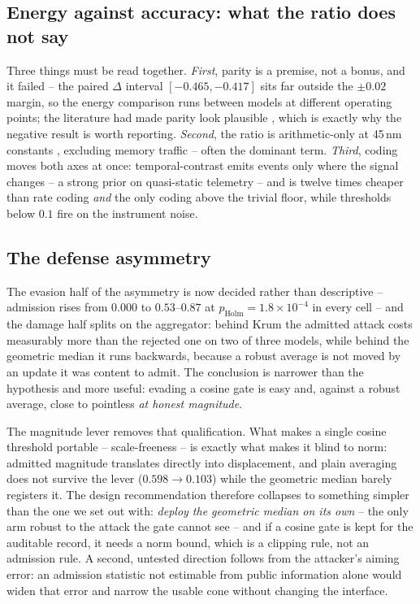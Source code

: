 \subsection{Energy against accuracy: what the ratio does not say}

Three things must be read together. \emph{First}, parity is a premise,
not a bonus, and it failed -- the paired $\Delta$\macroF{} interval
$[-0.465,-0.417]$ sits far outside the $\pm0.02$ margin, so the energy
comparison runs between models at different operating points; the
literature had made parity look plausible \cite{mahapatra2021}, which is
exactly why the negative result is worth reporting. \emph{Second}, the
ratio is arithmetic-only at 45\,nm constants \cite{horowitz2014},
excluding memory traffic -- often the dominant term. \emph{Third},
coding moves both axes at once: temporal-contrast emits events only
where the signal changes -- a strong prior on quasi-static telemetry --
and is twelve times cheaper than rate coding \emph{and} the only coding
above the trivial floor, while thresholds below $0.1$ fire on the
instrument noise.

\subsection{The defense asymmetry}

The evasion half of the asymmetry is now decided rather than descriptive
-- admission rises from $0.000$ to $0.53$--$0.87$ at
$p_{\mathrm{Holm}} = 1.8\times10^{-4}$ in every cell -- and the damage
half splits on the aggregator: behind Krum the admitted attack costs
measurably more than the rejected one on two of three models, while
behind the geometric median it runs backwards, because a robust average
is not moved by an update it was content to admit. The conclusion is
narrower than the hypothesis and more useful: evading a cosine gate is
easy and, against a robust average, close to pointless \emph{at honest
magnitude}.

The magnitude lever removes that qualification. What makes a single
cosine threshold portable -- scale-freeness -- is exactly what makes it
blind to norm: admitted magnitude translates directly into displacement,
and plain averaging does not survive the lever ($0.598 \rightarrow
0.103$) while the geometric median barely registers it. The design
recommendation therefore collapses to something simpler than the one we
set out with: \emph{deploy the geometric median on its own} -- the only
arm robust to the attack the gate cannot see -- and if a cosine gate is
kept for the auditable record, it needs a norm bound, which is a
clipping rule, not an admission rule. A second, untested direction
follows from the attacker's aiming error: an admission statistic not
estimable from public information alone would widen that error and
narrow the usable cone without changing the interface.

